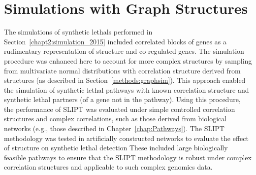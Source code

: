 

\iffalse
\section{Developing a linear model predictor of \glspl{synthetic lethal}}
\subsection{Linear models}
\subsection{Polynomial models}
\subsection{Conditioning}
\subsection{SLIPTv2}
\fi

\section{Simulations with Graph Structures}
\label{chapt5:graphsim}

The simulations of \glspl{synthetic lethal} performed in Section~\ref{chapt2:simulation_2015} included correlated blocks of genes as a rudimentary representation of  structure and co-regulated genes. The simulation procedure was enhanced here to account for more complex  structures by sampling from multivariate normal distributions with correlation structure derived from  structures (as described in Section~\ref{methods:graphsim}). This approach enabled the simulation of \gls{synthetic lethal} pathways with known correlation structure and synthetic lethal partners (of a gene not in the pathway).  Using this procedure, the performance of \gls{SLIPT} was evaluated under simple controlled correlation structures and complex correlations, such as those derived from biological networks (e.g., those described in Chapter~\ref{chap:Pathways}). The \gls{SLIPT} methodology was tested in artificially constructed networks to evaluate the effect of  structure on \gls{synthetic lethal} detection These included large biologically feasible pathways to ensure that the \gls{SLIPT} methodology is robust under complex correlation structures and applicable to such complex \glspl{genomic} data.

